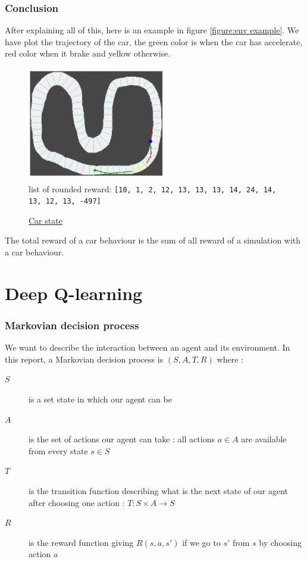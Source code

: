 \documentclass[11pt,a4paper]{article}
\newcounter{fig}
\begin{document}
		\section{Conclusion}
After explaining all of this, here is an example in figure \ref{figure:env example}. We have plot the trajectory of the car, the green color is when the car has accelerate, red color when it brake and yellow otherwise.
\begin{center}
\label{figure:env example}
	\begin{figure}[ht]
		\centering
		\includegraphics[width=6cm, height=5cm]{env_example.png}\\
		list of rounded reward: \texttt{[10, 1, 2, 12, 13, 13, 13, 14, 24, 14, 13, 12, 13, -497]}
		\caption{\underline{Car state}}
	\end{figure}
\end{center}
The total reward of a car behaviour is the sum of all reward of a simulation with a car behaviour.

	\part{Deep Q-learning}

		\section{Markovian decision process}
		We want to describe the interaction between an agent and its environment.
		In this report, a Markovian decision process is $(S,A,T,R)$ where :
		\begin{description}
			\item[$S$] is a set state in which our agent can be
			\item[$A$] is the set of actions our agent can take : all actions $a \in A$ are available from every state $s \in S$
			\item[$T$] is the transition function describing what is the next state of our agent after choosing one action : $T : S \times A \rightarrow S$
			\item[$R$] is the reward function giving   $R(s,a,s')$ if we go to $s'$ from $s$ by choosing action $a$
		\end{description}
 		
\end{document}
